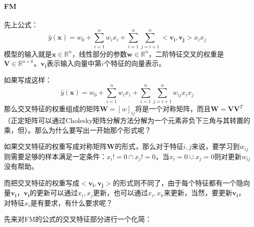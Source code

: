 \paragraph{FM}
先上公式：
$$
\hat{y}(\boldsymbol{x}) = w_0 + \sum_{i=1}^n w_i x_i + \sum_{i=1}^n \sum_{j = i+1}^n <\boldsymbol{v_i}, \boldsymbol{v_j}> x_i x_j
$$
模型的输入就是$\boldsymbol{x} \in \mathbb{R}^n$，线性部分的参数$\boldsymbol{w} \in \mathbb{R}^n$，二阶特征交叉的权重是$\boldsymbol{V} \in \mathbb{R}^{n \times k}$。$\boldsymbol{v_i}$表示输入向量中第$i$个特征的向量表示。

如果写成这样：
$$
\hat{y}(\boldsymbol{x}) = w_0 + \sum_{i=1}^n w_i x_i + \sum_{i=1}^n \sum_{j = i+1}^n w_{ij} x_i x_j
$$
那么交叉特征的权重组成的矩阵$\boldsymbol{W} = [w]_{ij}$将是一个对称矩阵，而且$\boldsymbol{W} = \boldsymbol{V} \boldsymbol{V}^T$（正定矩阵可以通过Cholesky矩阵分解方法分解为一个元素非负下三角与其转置的乘，但）。那么为什么要写出一开始那个形式呢？

如果交叉特征的权重写成对称矩阵$\boldsymbol{W}$的形式，那么对于特征$i, j$来说，要学习到$w_{ij}$则需要足够的样本满足一定条件：$x_i != 0 \cap x_j != 0$，当$x_i = 0 \cup x_j = 0$则对更新$w_{ij}$没有帮助。

而把交叉特征的权重写成$<\boldsymbol{v_i}, \boldsymbol{v_j}>$的形式则不同了，由于每个特征都有一个隐向量$\boldsymbol{v_i}$，$\boldsymbol{v_i}$的更新可以通过$x_i, x_j$更新，也可以通过$x_i, x_k$来更新，当然，要更新$\boldsymbol{v_i}$，对特征$x_i$是有要求，有什么要求呢？

先来对FM的公式的交叉特征部分进行一个化简：

